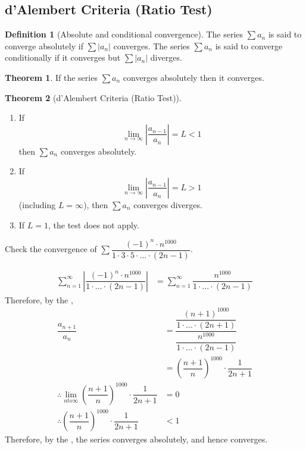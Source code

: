 \documentclass[fleqn, a4paper, 12pt, twoside]{article}
\theoremstyle{definition}
\newtheorem{definition}{Definition}
\theoremstyle{theorem}
\newtheorem{theorem}{Theorem}
\begin{document}
\subsection{d'Alembert Criteria (Ratio Test)}

\begin{definition}[Absolute and conditional convergence]
	The series $\sum a_n$ is said to converge absolutely if $\sum |a_n|$ converges.
	The series $\sum a_n$ is said to converge conditionally if it converges but $\sum |a_n|$ diverges.
\end{definition}

\begin{theorem}
	If the series $\sum a_n$ converges absolutely then it converges.
\end{theorem}

\begin{theorem}[d'Alembert Criteria (Ratio Test)]
	\begin{enumerate}
		\item 
			If 
			\begin{equation*}
			\lim\limits_{n \to \infty} \left| \dfrac{a_{n - 1}}{a_n} \right| = L < 1
			\end{equation*}
			then $\sum a_n$ converges absolutely.
		\item 
			If 
			\begin{equation*}
			\lim\limits_{n \to \infty} \left| \dfrac{a_{n - 1}}{a_n} \right| = L > 1
			\end{equation*}
			(including $L = \infty$), then $\sum a_n$ converges diverges.
		\item If $L = 1$, the test does not apply.
	\end{enumerate}
	\label{d'Alembert_Criteria_(Ratio_Test)}
\end{theorem}

\begin{question}
	Check the convergence of $\sum \dfrac{(-1)^n \cdot n^{1000}}{1 \cdot 3 \cdot 5 \cdot \dots \cdot (2n - 1)}$.
\end{question}

\begin{solution}
	\begin{align*}
	\sum_{n = 1}^{\infty} \left| \dfrac{(-1)^n \cdot n^{1000}}{1 \cdot \dots \cdot (2n - 1)} \right| &= \sum_{n = 1}^{\infty} \dfrac{n^{1000}}{1 \cdot \dots \cdot (2n - 1)}
	\end{align*}
	Therefore, by the ,
	\begin{align*}
		\dfrac{a_{n + 1}}{a_n} &= \dfrac{\dfrac{(n + 1)^{1000}}{1 \cdot \dots \cdot (2n + 1)}}{\dfrac{n^{1000}}{1 \cdot \dots \cdot (2n - 1)}}\\
		&= \left( \dfrac{n + 1}{n} \right)^{1000} \cdot \dfrac{1}{2n + 1}\\
		\therefore \lim\limits_{n to \infty} \left( \dfrac{n + 1}{n} \right)^{1000} \cdot \dfrac{1}{2n + 1} &= 0\\
		\therefore \left( \dfrac{n + 1}{n} \right)^{1000} \cdot \dfrac{1}{2n + 1} &< 1
	\end{align*}
	Therefore, by the , the series converges absolutely, and hence converges.
\end{solution}
\end{document}
